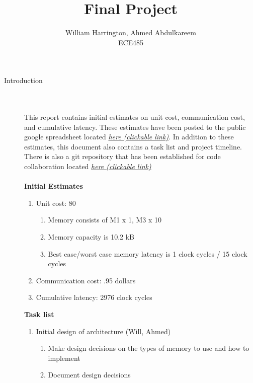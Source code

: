 \documentclass[12pt]{article}
\begin{document}
\title{Final Project}%
\author{William Harrington, Ahmed Abdulkareem\\ %
ECE485} %
 
\maketitle
\begin{description}
	\item[Introduction] \hfill \\ \\
		This report contains initial estimates on unit cost, communication cost, and cumulative latency. These estimates have been posted to the public google spreadsheet located \href{https://docs.google.com/spreadsheets/d/152m_0LO6tHNQxUT7HqHE1-DiTMms_f50gTfg4Mp_qx0/edit?usp=sharing}{\textit{here (clickable link)}}. In addition to these estimates, this document also contains a task list and project timeline. There is also a git repository that has been established for code collaboration located \href{https://github.com/wrh2/ECE485/tree/master/project}{\textit{here (clickable link)}} \\ \\
		\textbf{Initial Estimates}
		\begin{enumerate}
			\item Unit cost: 80
			\begin{enumerate}
				\item Memory consists of M1 x 1, M3 x 10
				\item Memory capacity is 10.2 kB
				\item Best case/worst case memory latency is 1 clock cycles / 15 clock cycles
			\end{enumerate}
			\item Communication cost: .95 dollars
			\item Cumulative latency: 2976 clock cycles
		\end{enumerate}
		\textbf{Task list}
		\begin{enumerate}
			\item Initial design of architecture (Will, Ahmed)
			\begin{enumerate}
				\item Make design decisions on the types of memory to use and how to implement
				\item Document design decisions
			\end{enumerate}

\end{enumerate}
\end{description}
\end{document}
